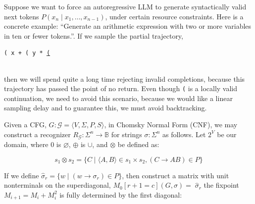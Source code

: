 \documentclass[portrait,a0b,final,a4resizeable]{a0poster}
\def\jointspacing{\vspace{0.3in}}
\begin{document}
\begin{poster}
\begin{multicols}{2}
\jointspacing

\null\hspace*{3cm}\begin{minipage}[c]{0.85\columnwidth}
Suppose we want to force an autoregressive LLM to generate syntactically valid next tokens $P(x_n \mid x_1, \ldots, x_{n-1})$, under certain resource constraints. Here is a concrete example: ``Generate an arithmetic expression with two or more variables in ten or fewer tokens.''. If we sample the partial trajectory,
\begin{center}\texttt{( x + ( y * }\underline{\texttt{(}}\end{center}\\
then we will spend quite a long time rejecting invalid completions, because this trajectory has passed the point of no return. Even though \texttt{(} is a locally valid continuation, we need to avoid this scenario, because we would like a linear sampling delay and to guarantee this, we must avoid backtracking.
\end{minipage}

      \jointspacing

      \null\hspace*{3cm}\begin{minipage}[c]{0.85\columnwidth}
          Given a CFG, $G: \mathcal{G} = \langle V, \Sigma, P, S\rangle$, in Chomsky Normal Form (CNF), we may construct a recognizer $R_\mathcal{G}: \Sigma^n \rightarrow \mathbb{B}$ for strings $\sigma: \Sigma^n$ as follows. Let $2^V$ be our domain, where $0$ is $\varnothing$, $\oplus$ is $\cup$, and $\otimes$ be defined as:\vspace{1cm}
      \end{minipage}

      \[
        s_1 \otimes s_2 = \{C \mid \langle A, B\rangle \in s_1 \times s_2, (C\rightarrow AB) \in P\}
      \]

      \null\hspace*{3cm}\begin{minipage}[c]{0.85\columnwidth}
If we define $\hat\sigma_r = \{w \mid (w \rightarrow \sigma_r) \in P\}$, then construct a matrix with unit nonterminals on the superdiagonal, $M_0[r+1=c](G, \sigma) = \;\hat\sigma_r$ the fixpoint $M_{i+1} = M_i + M_i^2$ is fully determined by the first diagonal:\vspace{0.5cm}
\end{minipage}


\end{multicols}
\end{poster}
\end{document}
